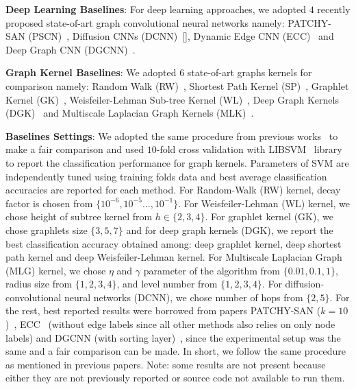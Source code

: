 \documentclass{article}
\begin{document}
\noindent \textbf{Deep Learning Baselines}: For deep learning approaches, we adopted $4$ recently proposed state-of-art graph convolutional neural networks namely: %
PATCHY-SAN (PSCN)~\cite{niepert2016learning}, Diffusion CNNs (DCNN)~[\cite{atwood2016diffusion}], Dynamic Edge CNN (ECC)~\cite{simonovsky2017dynamic}  and Deep Graph CNN (DGCNN)~\cite{zhang2018end}.  

\noindent \textbf{Graph Kernel Baselines}: We adopted $6$ state-of-art  graphs kernels for comparison namely: Random Walk (RW)~\cite{gartner2003graph}, Shortest Path Kernel (SP)~\cite{borgwardt2005shortest}, Graphlet Kernel (GK)~\cite{shervashidze2009efficient}, Weisfeiler-Lehman Sub-tree Kernel (WL)~\cite{shervashidze2011weisfeiler}, Deep Graph Kernels (DGK)~\cite{yanardag2015deep} and  Multiscale Laplacian Graph Kernels (MLK)~\cite{kondor2016multiscale}. 
 

\noindent \textbf{Baselines Settings}: We adopted the same procedure from previous works~\cite{niepert2016learning,yanardag2015deep,zhang2018end} to make a fair comparison and used $10$-fold cross validation with  
LIBSVM~\cite{chang2011libsvm} library to report the classification performance for graph kernels. Parameters of SVM are independently tuned using  training folds data and   best average classification accuracies are reported   for each    method. %
For Random-Walk (RW) kernel, decay factor is chosen from $\{10^{-6},10^{-5}...,10^{-1}\}$. For Weisfeiler-Lehman (WL) kernel, we chose height of subtree kernel from $h\in\{2,3,4\}$.  For graphlet kernel (GK), we chose graphlets size $\{3,5,7\}$ and for deep graph kernels (DGK), %
we report the best classification accuracy obtained among: deep graphlet kernel, deep shortest path kernel and deep Weisfeiler-Lehman kernel. For Multiscale Laplacian Graph (MLG) kernel, we chose $\eta$ and $\gamma$ parameter of the algorithm from $\{0.01,0.1,1\}$, radius size from $\{1,2,3,4\}$, and level number from $\{1,2,3,4\}$. For  diffusion-convolutional neural networks (DCNN), we chose number of hops from $\{2,5\}$. %
For the rest, best reported results were borrowed from papers PATCHY-SAN  ($k=10$)~\cite{niepert2016learning}, ECC~\cite{simonovsky2017dynamic} (without edge labels since all other methods also relies on only node labels) and DGCNN (with sorting layer)~\cite{zhang2018end}, since the experimental setup was the same and a fair comparison can be made. In short, we follow    the same procedure as mentioned in previous papers. Note: some results  are not present because either they are not previously reported  or source code not available to run them. 
\end{document}
